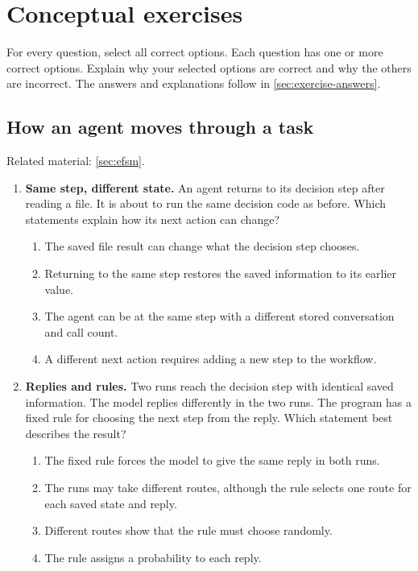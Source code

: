 \section{Conceptual exercises}
\label{sec:exercises}

For every question, select all correct options. Each question has one or more correct
options. Explain why your selected options are correct and why the others are incorrect.
The answers and explanations follow in \cref{sec:exercise-answers}.

\subsection{How an agent moves through a task}
\noindent Related material: \cref{sec:efsm}.

\begin{enumerate}[start=1,itemsep=0.7\baselineskip]
\item\label{exercise:1} \begin{minipage}[t]{\linewidth}
\textbf{Same step, different state.} An agent returns to its decision step after reading a file. It is about to run the same decision code as before. Which statements explain how its next action can change?
\begin{enumerate}[label=\textnormal{(\Alph*)},leftmargin=*,itemsep=0pt]
\item The saved file result can change what the decision step chooses.
\item Returning to the same step restores the saved information to its earlier value.
\item The agent can be at the same step with a different stored conversation and call count.
\item A different next action requires adding a new step to the workflow.
\end{enumerate}
\end{minipage}

\item\label{exercise:2} \begin{minipage}[t]{\linewidth}
\textbf{Replies and rules.} Two runs reach the decision step with identical saved information. The model replies differently in the two runs. The program has a fixed rule for choosing the next step from the reply. Which statement best describes the result?
\begin{enumerate}[label=\textnormal{(\Alph*)},leftmargin=*,itemsep=0pt]
\item The fixed rule forces the model to give the same reply in both runs.
\item The runs may take different routes, although the rule selects one route for each saved state and reply.
\item Different routes show that the rule must choose randomly.
\item The rule assigns a probability to each reply.
\end{enumerate}
\end{minipage}


\end{enumerate}
